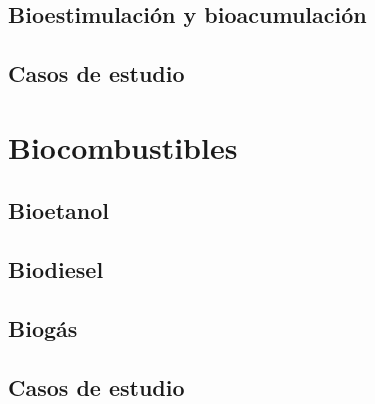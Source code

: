 \documentclass{../summarie}
\begin{document}
    \chapter{Bioestimulación y bioacumulación}
    \chapter{Casos de estudio}

\part{Biocombustibles}

    \chapter{Bioetanol}
    \chapter{Biodiesel}
    \chapter{Biogás}
    \chapter{Casos de estudio}


\newpage


\end{document}
